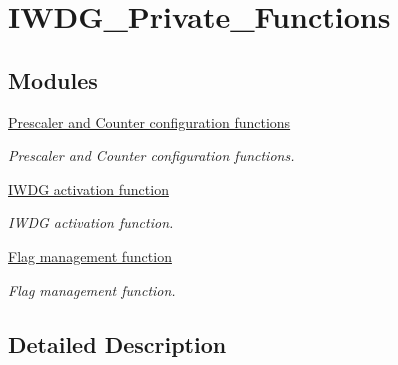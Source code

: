 \hypertarget{group___i_w_d_g___private___functions}{}\section{I\+W\+D\+G\+\_\+\+Private\+\_\+\+Functions}
\label{group___i_w_d_g___private___functions}
\subsection*{Modules}
\begin{DoxyCompactItemize}
\item 
\hyperlink{group___i_w_d_g___group1}{Prescaler and Counter configuration functions}
\begin{DoxyCompactList}\small\item\em Prescaler and Counter configuration functions. \end{DoxyCompactList}\item 
\hyperlink{group___i_w_d_g___group2}{I\+W\+D\+G activation function}
\begin{DoxyCompactList}\small\item\em I\+W\+D\+G activation function. \end{DoxyCompactList}\item 
\hyperlink{group___i_w_d_g___group3}{Flag management function}
\begin{DoxyCompactList}\small\item\em Flag management function. \end{DoxyCompactList}\end{DoxyCompactItemize}


\subsection{Detailed Description}
